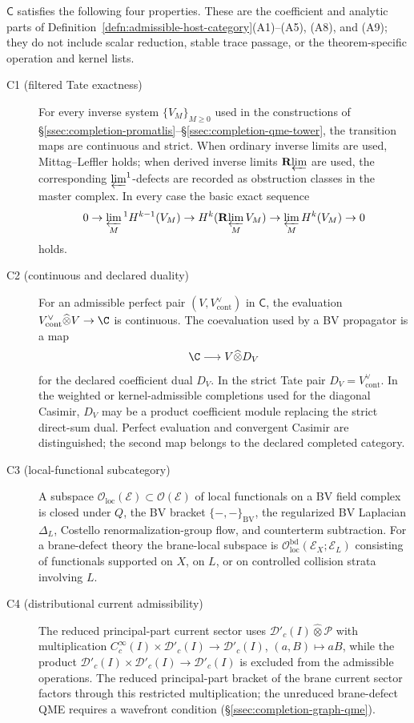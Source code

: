 \begin{lem}
\label{lem:completion-host-axioms}
\(\mathsf C\) satisfies the following four properties.  These are the
coefficient and analytic parts of
Definition~\ref{defn:admissible-host-category}(A1)--(A5), (A8), and
(A9); they do not include scalar reduction, stable trace passage, or the
theorem-specific operation and kernel lists.
\begin{description}
\item[\textnormal{C1 (filtered Tate exactness)}] For every inverse
  system \(\{V_M\}_{M\ge 0}\) used in the constructions of
  \S\ref{ssec:completion-promatlis}--\S\ref{ssec:completion-qme-tower},
  the transition maps are continuous and strict.  When ordinary
  inverse limits are used, Mittag--Leffler holds; when derived inverse
  limits \(\mathbf R\!\varprojlim\) are used, the corresponding
  \(\varprojlim^1\)-defects are recorded as obstruction classes in
  the master complex.  In every case the basic exact sequence
  \[
    0\to\varprojlim_M{}^1 H^{k-1}(V_M)\to
    H^k(\mathbf R\!\varprojlim_M V_M)\to
    \varprojlim_M H^k(V_M)\to 0
  \]
  holds.
\item[\textnormal{C2 (continuous and declared duality)}] For an
  admissible perfect pair \((V,V^\vee_{\mathrm{cont}})\) in
  \(\mathsf C\), the evaluation
  \(V^\vee_{\mathrm{cont}}\widehat\otimes V\to\C\) is continuous.  The
  coevaluation used by a BV propagator is a map
  \[
    \C\longrightarrow V\widehat\otimes D_V
  \]
  for the declared coefficient dual \(D_V\).  In the strict Tate pair
  \(D_V=V^\vee_{\mathrm{cont}}\).  In the weighted or
  kernel-admissible completions used for the diagonal Casimir,
  \(D_V\) may be a product coefficient module replacing the strict
  direct-sum dual.  Perfect evaluation and convergent Casimir are
  distinguished; the second map belongs to the declared completed
  category.
\item[\textnormal{C3 (local-functional subcategory)}]
  A subspace
  \(\mathcal O_{\mathrm{loc}}(\mathcal E)\subset\mathcal O(\mathcal E)\)
  of local functionals on a BV field complex is closed under \(Q\),
  the BV bracket \(\{-,-\}_{\mathrm{BV}}\), the regularized BV
  Laplacian \(\Delta_L\), Costello renormalization-group flow, and
  counterterm subtraction.  For a brane-defect theory the
  brane-local subspace is
  \(\mathcal O^{\mathrm{bd}}_{\mathrm{loc}}(\mathcal E_X;\mathcal E_L)\)
  consisting of functionals supported on \(X\), on \(L\), or on
  controlled collision strata involving \(L\).
\item[\textnormal{C4 (distributional current admissibility)}]
  The reduced principal-part current sector uses
  \(\mathcal D'_c(I)\widehat\otimes\mathcal P\) with multiplication
  \(C^\infty_c(I)\times\mathcal D'_c(I)\to\mathcal D'_c(I)\),
  \((a,B)\mapsto aB\), while the product
  \(\mathcal D'_c(I)\times\mathcal D'_c(I)\to\mathcal D'_c(I)\) is
	  excluded from the admissible operations.  The reduced principal-part bracket
	  of the brane current sector
	  factors through this restricted multiplication; the unreduced
  brane-defect QME requires a wavefront condition
  (\S\ref{ssec:completion-graph-qme}).
\end{description}
\end{lem}

